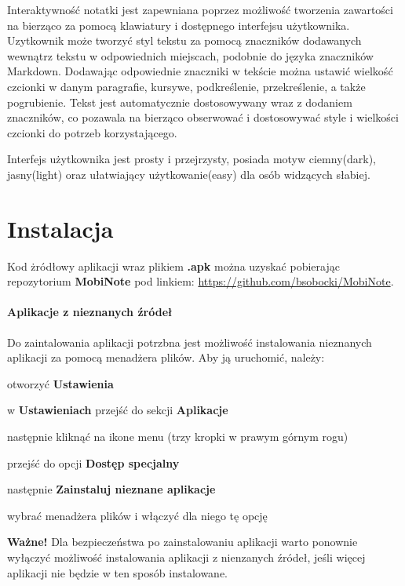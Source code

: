 \documentclass[shortabstract]{iithesis}
\begin{document}
Interaktywność notatki jest zapewniana poprzez możliwość tworzenia zawartości na bierząco za pomocą klawiatury i dostępnego interfejsu użytkownika.
Uzytkownik może tworzyć styl tekstu za pomocą znaczników dodawanych wewnątrz tekstu w odpowiednich miejscach, podobnie do języka znaczników Markdown.
Dodawając odpowiednie znaczniki w tekście można ustawić wielkość czcionki w danym paragrafie, kursywe, podkreślenie, przekreślenie, a także pogrubienie.
Tekst jest automatycznie dostosowywany wraz z dodaniem znaczników, co pozawala na bierząco obserwować i dostosowywać style i wielkości czcionki do potrzeb korzystającego.

Interfejs użytkownika jest prosty i przejrzysty, posiada motyw ciemny(dark), jasny(light) oraz ułatwiający użytkowanie(easy) dla osób widzących słabiej.

\chapter{Instalacja}

Kod żródłowy aplikacji wraz plikiem \textbf{.apk} można uzyskać pobierając repozytorium \textbf{MobiNote} pod linkiem:
\url{https://github.com/bsobocki/MobiNote}.

\subsubsection{Aplikacje z nieznanych źródeł}
Do zaintalowania aplikacji potrzbna jest możliwość instalowania nieznanych aplikacji za pomocą menadżera plików.
Aby ją uruchomić, należy:
\begin{compactitem}
    \item otworzyć \textbf{Ustawienia}
    \item w \textbf{Ustawieniach} przejść do sekcji \textbf{Aplikacje}
    \item następnie kliknąć na ikone menu (trzy kropki w prawym górnym rogu)
    \item przejść do opcji \textbf{Dostęp specjalny}
    \item następnie \textbf{Zainstaluj nieznane aplikacje}
    \item wybrać menadżera plików i włączyć dla niego tę opcję
\end{compactitem}

\textbf{Ważne!} Dla bezpieczeństwa po zainstalowaniu aplikacji warto ponownie wyłączyć możliwość instalowania aplikacji z nienzanych źródeł, jeśli więcej aplikacji nie będzie w ten sposób instalowane.
\end{document}
